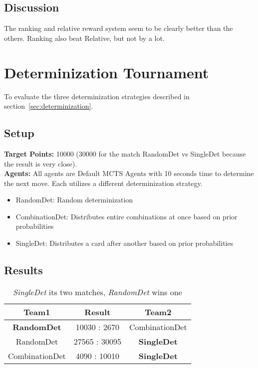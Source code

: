 \subsection*{Discussion}
The ranking and relative reward system seem to be clearly better than the others.
Ranking also beat Relative, but not by a lot.

\section{Determinization Tournament}
\label{sec:detexp}
To evaluate the three determinization strategies described in section~\ref{sec:determinization}.
\subsection*{Setup}
\textbf{Target Points:} 10000 (30000 for the match RandomDet vs SingleDet because the result is very close).\\
\textbf{Agents:}
All agents are Default MCTS Agents with 10 seconds time to determine the next move. Each utilizes a different determinization strategy.
\begin{itemize}
    \setlength\itemsep{2px}
    \item RandomDet: Random determinization
    \item CombinationDet: Distributes entire combinations at once based on prior probabilities
    \item SingleDet: Distributes a card after another based on prior probabilities
\end{itemize}

\subsection*{Results}
\begin{table}[h!]
  \centering

  \begin{tabular}{ccc}
    \textbf{Team1} & \textbf{Result}  & \textbf{Team2}\\
    \hline
    \textbf{RandomDet} &  10030 : 2670 & CombinationDet\\
    \hline
    RandomDet &  27565 : 30095 & \textbf{SingleDet}\\
    \hline
    CombinationDet & 4090 : 10010  & \textbf{SingleDet}\\
    \hline
  \end{tabular}
  \caption[Result of the Determinization Tournament]{\textit{SingleDet} its two matches, \textit{RandomDet} wins one}
\end{table}

